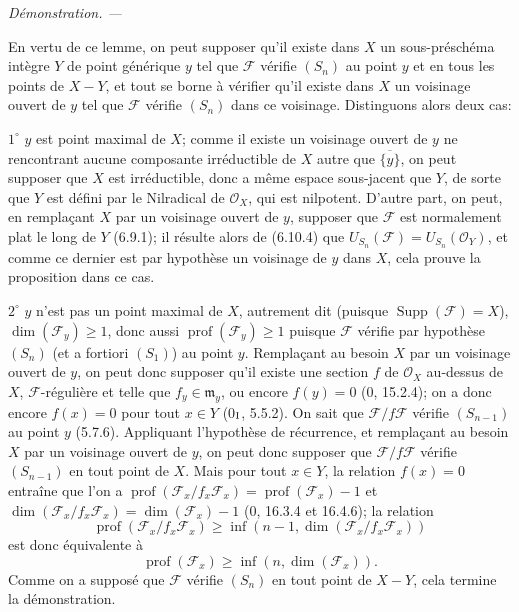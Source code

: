 \documentclass[10pt,oneside]{book}
\newcommand{\oldpage}[2][]{%
  \setcounter{footnote}{0}%
  \marginpar{\scriptsize\textbf{#1}~|~#2}\ignorespaces}
\newenvironment{proof}{%
  \par\medskip\noindent\textit{Démonstration. ---\ }}{\par}
\begin{document}
\begin{proof}
\oldpage[IV-2]{161}

En vertu de ce lemme, on peut supposer qu'il existe dans $X$ un
sous-préschéma intègre $Y$ de point générique $y$ tel que $\mathcal F$
vérifie $(S_n)$ au point $y$ et en tous les points de $X-Y$, et tout se
borne à vérifier qu'il existe dans $X$ un voisinage ouvert de $y$ tel que
$\mathcal F$ vérifie $(S_n)$ dans ce voisinage. Distinguons alors deux cas:

$1^\circ$ $y$ est point maximal de $X$; comme il existe un voisinage ouvert
de $y$ ne rencontrant aucune composante irréductible de $X$ autre que
$\overline{\{y\}}$, on peut supposer que $X$ est irréductible, donc a même
espace sous-jacent que $Y$, de sorte que $Y$ est défini par le Nilradical de
$\mathcal O_X$, qui est nilpotent. D'autre part, on peut, en remplaçant $X$
par un voisinage ouvert de $y$, supposer que $\mathcal F$ est normalement
plat le long de $Y$ (6.9.1); il résulte alors de (6.10.4) que
$U_{S_n}(\mathcal F)=U_{S_n}(\mathcal O_Y)$, et comme ce dernier est par
hypothèse un voisinage de $y$ dans $X$, cela prouve la proposition dans ce
cas.

$2^\circ$ $y$ n'est pas un point maximal de $X$, autrement dit (puisque
$\operatorname{Supp}(\mathcal F)=X$), $\dim(\mathcal F_y)\geq1$, donc aussi
$\operatorname{prof}(\mathcal F_y)\geq1$ puisque $\mathcal F$ vérifie par
hypothèse $(S_n)$ (et a fortiori $(S_1)$) au point $y$. Remplaçant au besoin
$X$ par un voisinage ouvert de $y$, on peut donc supposer qu'il existe une
section $f$ de $\mathcal O_X$ au-dessus de $X$, $\mathcal F$-régulière et
telle que $f_y\in\mathfrak m_y$, ou encore $f(y)=0$ (0, 15.2.4); on a donc
encore $f(x)=0$ pour tout $x\in Y$ (0$_{\rm I}$, 5.5.2). On sait que
$\mathcal F/f\mathcal F$ vérifie $(S_{n-1})$ au point $y$ (5.7.6).
Appliquant l'hypothèse de récurrence, et remplaçant au besoin $X$ par un
voisinage ouvert de $y$, on peut donc supposer que
$\mathcal F/f\mathcal F$ vérifie $(S_{n-1})$ en tout point de $X$. Mais pour
tout $x\in Y$, la relation $f(x)=0$ entraîne que l'on a
$\operatorname{prof}(\mathcal F_x/f_x\mathcal F_x)=
\operatorname{prof}(\mathcal F_x)-1$ et
$\dim(\mathcal F_x/f_x\mathcal F_x)=\dim(\mathcal F_x)-1$
(0, 16.3.4 et 16.4.6); la relation
\[
\operatorname{prof}(\mathcal F_x/f_x\mathcal F_x)\geq
\inf(n-1,\dim(\mathcal F_x/f_x\mathcal F_x))
\]
est donc équivalente à
\[
\operatorname{prof}(\mathcal F_x)\geq\inf(n,\dim(\mathcal F_x)).
\]
Comme on a supposé que $\mathcal F$ vérifie $(S_n)$ en tout point de $X-Y$,
cela termine la démonstration.
\end{proof}
\end{document}
